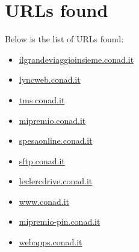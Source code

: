 \documentclass{article}
\begin{document}
\section*{URLs found}

Below is the list of URLs found:

\begin{itemize}
    
        
        
        \item \href{ https://ilgrandeviaggioinsieme.conad.it/ }{ ilgrandeviaggioinsieme.conad.it }
    
        
        
        \item \href{ https://lyncweb.conad.it/ }{ lyncweb.conad.it }
    
        
        
        \item \href{ https://tms.conad.it/core/framework/login.cfm }{ tms.conad.it }
    
        
        
        \item \href{ https://mipremio.conad.it/ }{ mipremio.conad.it }
    
        
        
        \item \href{ https://spesaonline.conad.it/order?bEcommerce=sap\&orderId=o-s-N-23-03667190 }{ spesaonline.conad.it }
    
        
        
        \item \href{ http://sftp.conad.it }{ sftp.conad.it }
    
        
        
        \item \href{ http://leclercdrive.conad.it/ }{ leclercdrive.conad.it }
    
        
        
        \item \href{ https://www.conad.it/ricerca-negozi?utm\_source=crm\&utm\_medium=email\&utm\_content=124647515\&utm\_campaign=\_ }{ www.conad.it }
    
        
        
        \item \href{ http://mipremio-pin.conad.it/ }{ mipremio-pin.conad.it }
    
        
        
        \item \href{ http://webapps.conad.it }{ webapps.conad.it }
    

\end{itemize}
\end{document}
